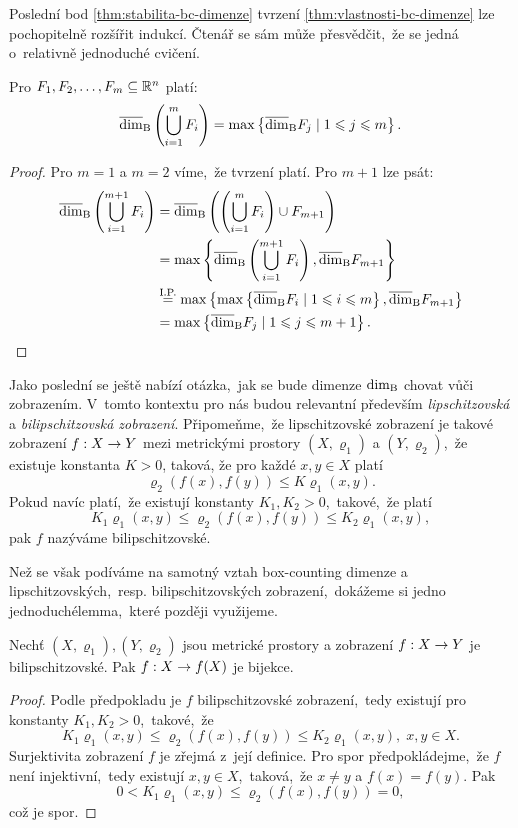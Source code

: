 Poslední bod \ref{thm:stabilita-bc-dimenze} tvrzení \ref{thm:vlastnosti-bc-dimenze} lze pochopitelně rozšířit indukcí. Čtenář se sám může přesvědčit,~že se jedná o~relativně jednoduché cvičení.
\begin{corollary}\label{cor:stabilita-bc-dimenze-obecne}
    Pro $F_1,F_2,\ldots,F_m\subseteq\mathbb{R}^n$ platí:
    \[\overline{\dim}_\textup{B}\left(\bigcup_{i=1}^m F_i\right)=\max\left\{\overline{\dim}_\textup{B}{F_j}\mid 1\leqslant j\leqslant m\right\}.\]
\end{corollary}
\begin{proof}
    Pro $m=1$ a $m=2$ víme,~že tvrzení platí. Pro $m+1$ lze psát:
    \begin{align*}
        \overline{\dim}_\textup{B}\left(\bigcup_{i=1}^{m+1}F_i\right)&=\overline{\dim}_\textup{B}\left(\left(\bigcup_{i=1}^{m}F_i\right)\cup F_{m+1}\right)\\
        &=\max\left\{\overline{\dim}_\textup{B}\left(\bigcup_{i=1}^{m+1}F_i\right),\overline{\dim}_\textup{B}{F_{m+1}}\right\}\\
        &\stackrel{\text{I.P.}}{=}\max\left\{\max\left\{\overline{\dim}_\textup{B}{F_i}\mid 1\leqslant i\leqslant m\right\},\overline{\dim}_\textup{B}{F_{m+1}}\right\}\\
        &=\max\left\{\overline{\dim}_\textup{B}{F_j}\mid 1\leqslant j\leqslant m+1\right\}.
    \end{align*}
\end{proof}

Jako poslední se ještě nabízí otázka,~jak se bude dimenze $\operatorname{dim_B}$ chovat vůči zobrazením. V~tomto kontextu pro nás budou relevantní především \emph{lipschitzovská} a \emph{bilipschitzovská zobrazení}. Připomeňme,~že lipschitzovské zobrazení je takové zobrazení $f:X \rightarrow Y$ mezi metrickými prostory $(X,\varrho_1)$ a $(Y,\varrho_2)$,~že existuje konstanta $K>0$, taková, že pro každé $x,y\in X$ platí
\[\varrho_2(f(x),f(y))\leqslant K\varrho_1(x,y).\]
Pokud navíc platí,~že existují konstanty $K_1,K_2>0$,~takové,~že platí
\[K_1\varrho_1(x,y)\leqslant\varrho_2(f(x),f(y))\leqslant K_2\varrho_1(x,y),\]
pak $f$ nazýváme bilipschitzovské.

Než se však podíváme na samotný vztah box-counting dimenze a lipschitzovských,~resp. bilipschitzovských zobrazení,~dokážeme si jedno jednoduché\linebreak{}lemma,~které později využijeme.
\begin{lemma}\label{lem:lipschitzovska-zobrazeni-a-bijekce}
    Nechť $(X,\varrho_1),(Y,\varrho_2)$ jsou metrické prostory a zobrazení $f:X \rightarrow Y$ je bilipschitzovské. Pak $f:X \rightarrow f(X)$ je bijekce.
\end{lemma}
\begin{proof}
    Podle předpokladu je $f$ bilipschitzovské zobrazení,~tedy existují pro konstanty $K_1,K_2>0$,~takové,~že
    \[K_1\varrho_1(x,y)\leqslant\varrho_2(f(x),f(y))\leqslant K_2\varrho_1(x,y),\;x,y\in X.\]
    Surjektivita zobrazení $f$ je zřejmá z~její definice. Pro spor předpokládejme,~že $f$ není injektivní,~tedy existují $x,y\in X$,~taková,~že $x\neq y$ a $f(x)=f(y)$. Pak
    \[0<K_1\varrho_1(x,y)\leqslant\varrho_2(f(x),f(y))=0,\]
    což je spor.
\end{proof}

